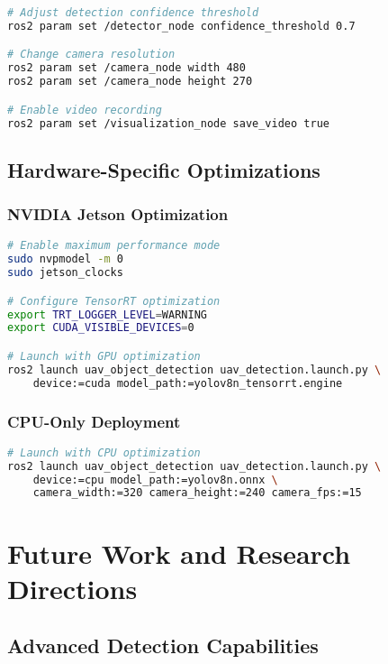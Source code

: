 \documentclass[12pt,a4paper]{article}
\begin{document}
\begin{lstlisting}[language=bash, caption=Runtime Parameter Modification]
# Adjust detection confidence threshold
ros2 param set /detector_node confidence_threshold 0.7

# Change camera resolution
ros2 param set /camera_node width 480
ros2 param set /camera_node height 270

# Enable video recording
ros2 param set /visualization_node save_video true
\end{lstlisting}

\subsection{Hardware-Specific Optimizations}

\subsubsection{NVIDIA Jetson Optimization}

\begin{lstlisting}[language=bash, caption=Jetson-Specific Configuration]
# Enable maximum performance mode
sudo nvpmodel -m 0
sudo jetson_clocks

# Configure TensorRT optimization
export TRT_LOGGER_LEVEL=WARNING
export CUDA_VISIBLE_DEVICES=0

# Launch with GPU optimization
ros2 launch uav_object_detection uav_detection.launch.py \
    device:=cuda model_path:=yolov8n_tensorrt.engine
\end{lstlisting}

\subsubsection{CPU-Only Deployment}

\begin{lstlisting}[language=bash, caption=CPU-Only Configuration]
# Launch with CPU optimization
ros2 launch uav_object_detection uav_detection.launch.py \
    device:=cpu model_path:=yolov8n.onnx \
    camera_width:=320 camera_height:=240 camera_fps:=15
\end{lstlisting}

\section{Future Work and Research Directions}

\subsection{Advanced Detection Capabilities}
\end{document}
